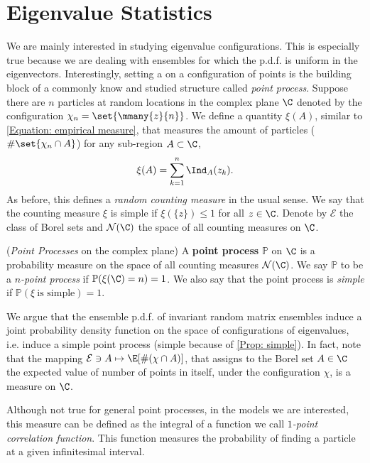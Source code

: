 \section{Eigenvalue Statistics}

We are mainly interested in studying eigenvalue configurations. This is especially true because we are dealing with ensembles for which the p.d.f. is uniform in the eigenvectors. Interestingly, setting a  on a configuration of points is the building block of a commonly know and studied structure called \textit{point process}. Suppose there are $n$ particles at random locations in the complex plane $\C$ denoted by the configuration $\chi_n = \set{\mmany{z}{n}}$. We define a quantity $\xi(A)$, similar to \eqref{Equation: empirical measure}, that measures the amount of particles ($\#\set{\chi_n \cap A}$) for any sub-region $A \subset \C$,
\begin{equation}
	\xi(A) = \sum_{k=1}^{n} \Ind_{A}(z_k).
\end{equation}
As before, this defines a \textit{random counting measure} in the usual sense. We say that the counting measure $\xi$ is simple if $\xi(\{z\}) \leq 1$ for all $z \in \C$. Denote by $\mathcal{E}$ the class of Borel sets and $\mathcal{N}(\C)$ the space of all counting measures on $\C$.

\begin{definicao}	\label{Definition: Point Process}
	(\textit{Point Processes} on the complex plane)
		A \textbf{point process} $\mathbb{P}$ on $\C$ is a probability measure on the space of all counting measures $\mathcal{N}(\C)$. We say $\mathbb{P}$ to be a \textit{$n$-point process} if $\mathbb{P}(\xi(\C) = n)  = 1$. We also say that the point process is \textit{simple} if $\mathbb{P}( \xi \ \text{is simple}) = 1$.
\end{definicao}

We argue that the ensemble p.d.f. of invariant random matrix ensembles induce a joint probability density function on the space of configurations of eigenvalues, i.e. induce a simple point process (simple because of \autoref{Prop: simple}). In fact, note that the mapping $\mathcal{E} \ni A \mapsto \E[\#(\chi \cap A)]$, that assigns to the Borel set $A \in \C$ the expected value of number of points in itself, under the configuration $\chi$, is a measure on $\C$. 

Although not true for general point processes, in the models we are interested, this measure can be defined as the integral of a function we call \textit{$1$-point correlation function}. This function measures the probability of finding a particle at a given infinitesimal interval.

